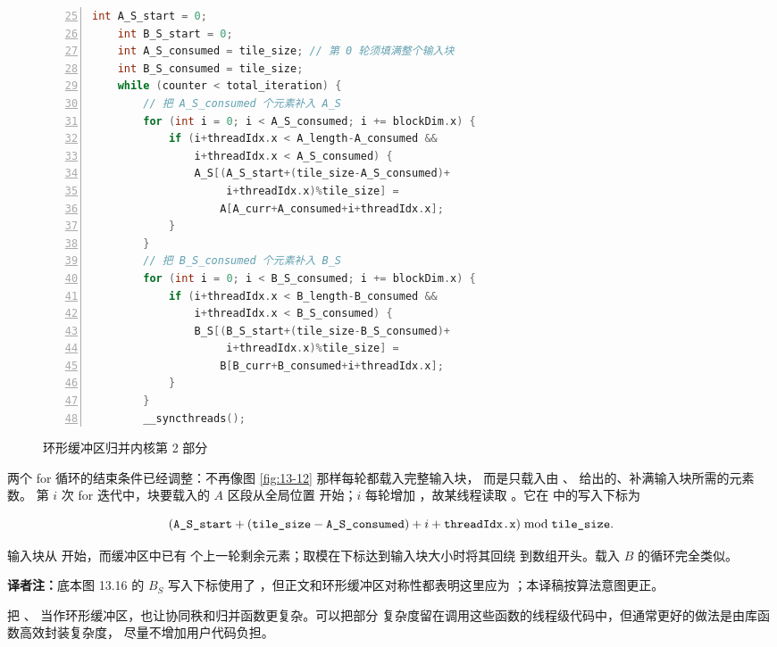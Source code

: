 \begin{figure}[htbp]
  \centering
  \begin{minipage}{0.99\textwidth}
  \begin{lstlisting}[language=C++,numbers=left,firstnumber=25]
    int A_S_start = 0;
    int B_S_start = 0;
    int A_S_consumed = tile_size; // 第 0 轮须填满整个输入块
    int B_S_consumed = tile_size;
    while (counter < total_iteration) {
        // 把 A_S_consumed 个元素补入 A_S
        for (int i = 0; i < A_S_consumed; i += blockDim.x) {
            if (i+threadIdx.x < A_length-A_consumed &&
                i+threadIdx.x < A_S_consumed) {
                A_S[(A_S_start+(tile_size-A_S_consumed)+
                     i+threadIdx.x)%tile_size] =
                    A[A_curr+A_consumed+i+threadIdx.x];
            }
        }
        // 把 B_S_consumed 个元素补入 B_S
        for (int i = 0; i < B_S_consumed; i += blockDim.x) {
            if (i+threadIdx.x < B_length-B_consumed &&
                i+threadIdx.x < B_S_consumed) {
                B_S[(B_S_start+(tile_size-B_S_consumed)+
                     i+threadIdx.x)%tile_size] =
                    B[B_curr+B_consumed+i+threadIdx.x];
            }
        }
        __syncthreads();
  \end{lstlisting}
  \end{minipage}
  \caption{环形缓冲区归并内核第 2 部分}
  \label{fig:13-16}
\end{figure}

两个 for 循环的结束条件已经调整：不再像图 \ref{fig:13-12} 那样每轮都载入完整输入块，
而是只载入由 、 给出的、补满输入块所需的元素数。
第 $i$ 次 for 迭代中，块要载入的 $A$ 区段从全局位置
 开始；$i$ 每轮增加 ，故某线程读取
。它在  中的写入下标为

\[
  (\code{A_S_start}+(\code{tile_size}-\code{A_S_consumed})
   +i+\code{threadIdx.x})\bmod\code{tile_size}.
\]

输入块从  开始，而缓冲区中已有
 个上一轮剩余元素；取模在下标达到输入块大小时将其回绕
到数组开头。载入 $B$ 的循环完全类似。

\noindent\textbf{译者注：}底本图 13.16 的 $B_S$ 写入下标使用了
，但正文和环形缓冲区对称性都表明这里应为
；本译稿按算法意图更正。

把 、 当作环形缓冲区，也让协同秩和归并函数更复杂。可以把部分
复杂度留在调用这些函数的线程级代码中，但通常更好的做法是由库函数高效封装复杂度，
尽量不增加用户代码负担。

